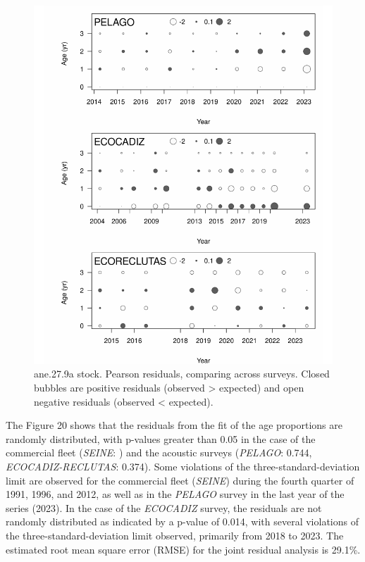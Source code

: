 \documentclass[
]{article}
\begin{document}
\begin{figure}[H]

{\centering \includegraphics[width=0.95\linewidth]{Report_SS3_quarter_with_age_data_MR_prueba_mod_files/figure-latex/unnamed-chunk-27-1} 

}

\caption{ane.27.9a stock.  Pearson residuals, comparing across surveys. Closed bubbles are positive residuals (observed > expected) and open negative residuals (observed < expected).}\label{fig:unnamed-chunk-27}
\end{figure}

The Figure 20 shows that the residuals from the fit of the age
proportions are randomly distributed, with p-values greater than 0.05 in
the case of the commercial fleet (\emph{SEINE}: ) and the acoustic
surveys (\emph{PELAGO}: 0.744, \emph{ECOCADIZ-RECLUTAS}: 0.374). Some
violations of the three-standard-deviation limit are observed for the
commercial fleet (\emph{SEINE}) during the fourth quarter of 1991, 1996,
and 2012, as well as in the \emph{PELAGO} survey in the last year of the
series (2023). In the case of the \emph{ECOCADIZ} survey, the residuals
are not randomly distributed as indicated by a p-value of 0.014, with
several violations of the three-standard-deviation limit observed,
primarily from 2018 to 2023. The estimated root mean square error (RMSE)
for the joint residual analysis is 29.1\%.
\end{document}
